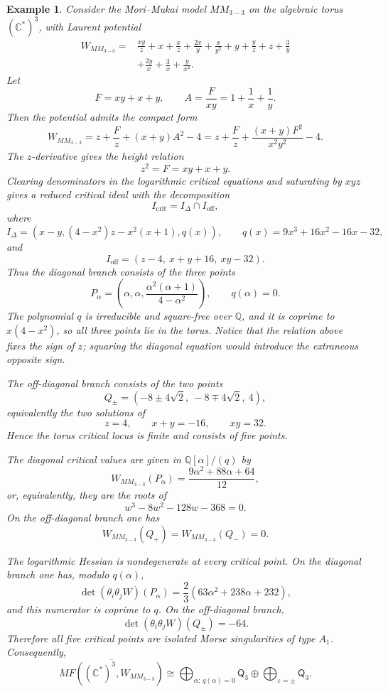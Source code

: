 \documentclass[11pt]{amsart}
\newtheorem{example}{Example}[section]
\newcommand{\MorseCat}[1]{\mathsf{Q}_{#1}}
\begin{document}
\begin{example}
Consider the Mori--Mukai model $MM_{3-3}$ on the algebraic torus
$(\mathbb{C}^*)^3$, with Laurent potential
\begin{align*}
W_{MM_{3-3}}={}&\frac{xy}{z}+x+\frac{x}{z}+\frac{2x}{y}
+\frac{x}{y^2}+y+\frac{y}{z}+z+\frac{3}{y} \\
&+\frac{2y}{x}+\frac{3}{x}+\frac{y}{x^2}.
\end{align*}
Let
\[
F=xy+x+y,
\qquad
A=\frac{F}{xy}=1+\frac{1}{x}+\frac{1}{y}.
\]
Then the potential admits the compact form
\[
W_{MM_{3-3}}
=z+\frac{F}{z}+(x+y)A^2-4
=z+\frac{F}{z}+\frac{(x+y)F^2}{x^2y^2}-4.
\]
The $z$-derivative gives the height relation
\[
z^2=F=xy+x+y.
\]
Clearing denominators in the logarithmic critical equations and saturating by
$xyz$ gives a reduced critical ideal with the decomposition
\[
I_{\mathrm{crit}}=I_{\Delta}\cap I_{\mathrm{off}},
\]
where
\[
I_{\Delta}=\left(
x-y,
(4-x^2)z-x^2(x+1),
q(x)
\right),
\qquad
q(x)=9x^3+16x^2-16x-32,
\]
and
\[
I_{\mathrm{off}}=(z-4,\ x+y+16,\ xy-32).
\]
Thus the diagonal branch consists of the three points
\[
P_{\alpha}=\left(
\alpha,
\alpha,
\frac{\alpha^2(\alpha+1)}{4-\alpha^2}
\right),
\qquad
q(\alpha)=0.
\]
The polynomial $q$ is irreducible and square-free over $\mathbb{Q}$, and it is
coprime to $x(4-x^2)$, so all three points lie in the torus. Notice that the
relation above fixes the sign of $z$; squaring the diagonal equation would
introduce the extraneous opposite sign.

The off-diagonal branch consists of the two points
\[
Q_{\pm}=(-8\pm4\sqrt{2},\ -8\mp4\sqrt{2},\ 4),
\]
equivalently the two solutions of
\[
z=4,
\qquad
x+y=-16,
\qquad
xy=32.
\]
Hence the torus critical locus is finite and consists of five points.

The diagonal critical values are given in $\mathbb{Q}[\alpha]/(q)$ by
\[
W_{MM_{3-3}}(P_{\alpha})
=\frac{9\alpha^2+88\alpha+64}{12},
\]
or, equivalently, they are the roots of
\[
w^3-8w^2-128w-368=0.
\]
On the off-diagonal branch one has
\[
W_{MM_{3-3}}(Q_+)=W_{MM_{3-3}}(Q_-)=0.
\]

The logarithmic Hessian is nondegenerate at every critical point. On the
diagonal branch one has, modulo $q(\alpha)$,
\[
\det(\theta_i\theta_jW)(P_{\alpha})
=\frac{2}{3}(63\alpha^2+238\alpha+232),
\]
and this numerator is coprime to $q$. On the off-diagonal branch,
\[
\det(\theta_i\theta_jW)(Q_\pm)=-64.
\]
Therefore all five critical points are isolated Morse singularities of type
$A_1$. Consequently,
\[
\overline{MF((\mathbb{C}^*)^3,W_{MM_{3-3}})}
\cong \bigoplus_{\alpha:\,q(\alpha)=0}\MorseCat{3} \oplus \bigoplus_{\varepsilon=\pm}\MorseCat{3}.
\]
\end{example}
\end{document}
